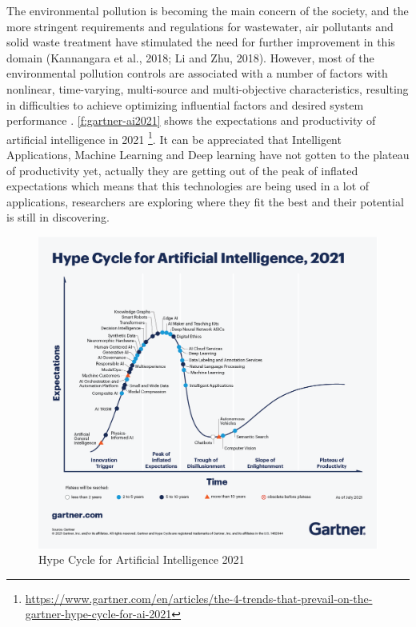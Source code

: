 The environmental pollution is becoming the main concern of the society, and the more stringent requirements and regulations for wastewater, air pollutants and solid waste treatment have stimulated the need for further improvement in this domain (Kannangara et al., 2018; Li and Zhu, 2018). However, most of the environmental pollution controls are associated with a number of factors with nonlinear, time-varying, multi-source and multi-objective characteristics, resulting in difficulties to achieve optimizing influential factors and desired system performance \cite{Ye2020}. \autoref{f:gartner-ai2021} shows the expectations and productivity of artificial intelligence in 2021 \footnote{\url{https://www.gartner.com/en/articles/the-4-trends-that-prevail-on-the-gartner-hype-cycle-for-ai-2021}}. It can be appreciated that Intelligent Applications, Machine Learning and Deep learning have not gotten to the plateau of productivity yet, actually they are getting out of the peak of inflated expectations which means that this technologies are being used in a lot of applications, researchers are exploring where they fit the best and their potential is still in discovering. 

\begin{figure}[t]
\centering
\includegraphics[width=\linewidth]{figures/Ch1/gartner-ai2021.png}
\caption{Hype Cycle for Artificial Intelligence 2021}
\label{f:gartner-ai2021}
\end{figure}


